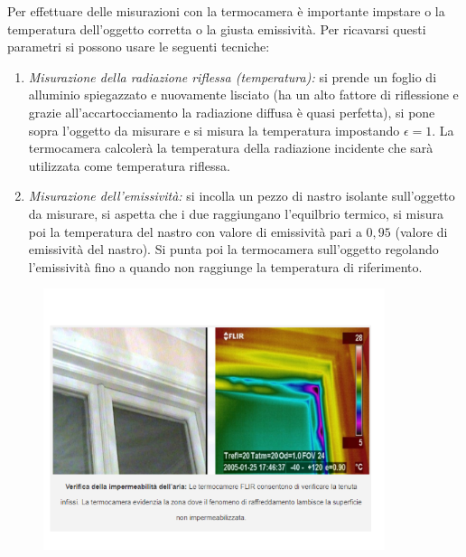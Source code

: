 Per effettuare delle misurazioni con la termocamera è importante impstare o la
temperatura dell'oggetto corretta o la giusta emissività. Per ricavarsi questi
parametri si possono usare le seguenti tecniche:

\begin{enumerate}
    \item \textit{Misurazione della radiazione riflessa (temperatura):} si prende
          un foglio di alluminio spiegazzato e nuovamente lisciato (ha un alto fattore di riflessione e
          grazie all'accartocciamento la radiazione diffusa è quasi perfetta), si pone
          sopra l'oggetto da misurare e si misura la temperatura impostando $\epsilon = 1$.
          La termocamera calcolerà la temperatura della radiazione incidente che sarà
          utilizzata come temperatura riflessa.
    \item \textit{Misurazione dell'emissività:} si incolla un pezzo di nastro
          isolante sull'oggetto da misurare, si aspetta che i due raggiungano l'equilbrio
          termico, si misura poi la temperatura del nastro con valore di emissività
          pari a $0,95$ (valore di emissività del nastro). Si punta poi la termocamera
          sull'oggetto regolando l'emissività fino a quando non raggiunge la temperatura
          di riferimento.
\end{enumerate}

\begin{figure}[H]
    \centering
    \includegraphics[width=10cm, keepaspectratio]{capitoli/immagini/imgs/termoesempio1.png}
\end{figure}


